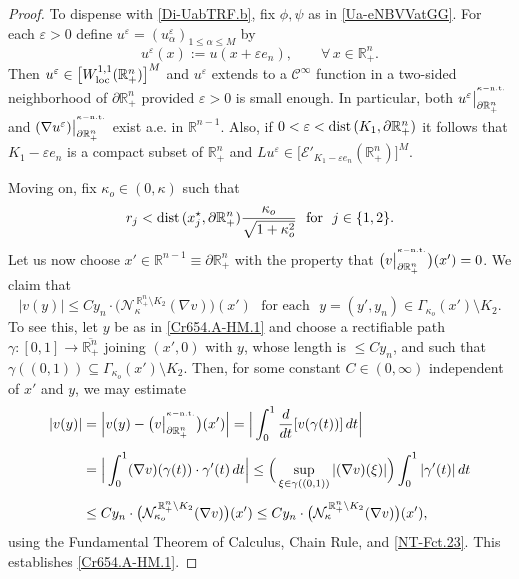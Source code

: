 \documentclass[11pt,reqno]{amsart}
\numberwithin{equation}{section}
\theoremstyle{remark}
\begin{document}
\begin{proof}
To dispense with \eqref{Di-UabTRF.b}, fix $\phi,\psi$ as in \eqref{Ua-eNBVVatGG}.
For each $\varepsilon>0$ define $u^\varepsilon=(u^\varepsilon_\alpha)_{1\leq\alpha\leq M}$ by 
%
\begin{equation}\label{Nvav-T54.a}
u^\varepsilon(x):=u(x+\varepsilon e_n),\qquad\forall\,x\in{\mathbb{R}}^n_{+}.
\end{equation}
%
Then $u^\varepsilon\in\big[W^{1,1}_{\rm loc}({\mathbb{R}}^n_{+})\big]^{M}$ and $u^\varepsilon$ extends to a  
${\mathscr{C}}^\infty$ function in a two-sided neighborhood of $\partial{\mathbb{R}}^n_{+}$ provided 
$\varepsilon>0$ is small enough. In particular, both 
$u^\varepsilon\big|_{\partial\mathbb{R}^{n}_{+}}^{{}^{\kappa-{\rm n.t.}}}$ and 
$(\nabla u^\varepsilon)\big|_{\partial\mathbb{R}^{n}_{+}}^{{}^{\kappa-{\rm n.t.}}}$ exist a.e. in ${\mathbb{R}}^{n-1}$.
Also, if $0<\varepsilon<{\rm dist}\,(K_1,\partial{\mathbb{R}}^n_{+})$ it follows that 
$K_1-\varepsilon e_n$ is a compact subset of ${\mathbb{R}}^n_{+}$ and 
$Lu^\varepsilon\in\big[{\mathcal{E}}'_{K_1-\varepsilon e_n}(\mathbb{R}^{n}_{+})\big]^M$.

Moving on, fix $\kappa_o\in(0,\kappa)$ such that 
%
\begin{equation}\label{CPTs.i}
r_j<{\rm dist}\,(x^\star_j,\partial{\mathbb{R}}^n_{+})\frac{\kappa_o}{\sqrt{1+\kappa^2_o}}
\,\,\text{ for }\,\,j\in\{1,2\}.
\end{equation}
%
Let us now choose $x'\in{\mathbb{R}}^{n-1}\equiv\partial{\mathbb{R}}^n_{+}$ 
with the property that $\big(v\big|^{{}^{\kappa-{\rm n.t.}}}_{\partial{\mathbb{R}}^n_{+}}\big)(x')=0$.
We claim that 
%
\begin{equation}\label{Cr654.A-HM.1}
|v(y)|\leq Cy_n\cdot\big({\mathcal{N}}^{\,\mathbb{R}^{n}_{+}\setminus K_2}_{\kappa}(\nabla v)\big)(x')
\,\,\text{ for each }\,\,y=(y',y_n)\in\Gamma_{\kappa_o}(x')\setminus K_2.
\end{equation}
% 
To see this, let $y$ be as in \eqref{Cr654.A-HM.1} and choose a rectifiable path 
$\gamma:[0,1]\to\overline{{\mathbb{R}}^n_{+}}$ joining $(x',0)$ with $y$, whose length is $\leq Cy_n$, 
and such that $\gamma((0,1))\subseteq\Gamma_{\kappa_o}(x')\setminus K_2$.
Then, for some constant $C\in(0,\infty)$ independent of $x'$ and $y$, we may estimate 
%
\begin{align}\label{Cr654.A-HM.1.xxx}
|v(y)| &=\Big|v(y)-\big(v\big|^{{}^{\kappa-{\rm n.t.}}}_{\partial{\mathbb{R}}^n_{+}}\big)(x')\Big|
=\Big|\int_0^1\frac{d}{dt}[v(\gamma(t))]\,dt\Big|
\nonumber\\[4pt]
&=\Big|\int_0^1(\nabla v)(\gamma(t))\cdot\gamma'(t)\,dt\Big|
\leq\Big(\sup_{\xi\in\gamma((0,1))}|(\nabla v)(\xi)|\Big)\int_0^1|\gamma'(t)|\,dt
\nonumber\\[4pt]
&\leq Cy_n\cdot\big({\mathcal{N}}^{\,\mathbb{R}^{n}_{+}\setminus K_2}_{\kappa_o}(\nabla v)\big)(x')
\leq Cy_n\cdot\big({\mathcal{N}}^{\,\mathbb{R}^{n}_{+}\setminus K_2}_{\kappa}(\nabla v)\big)(x'),
\end{align}
%
using the Fundamental Theorem of Calculus, Chain Rule, and \eqref{NT-Fct.23}. This establishes \eqref{Cr654.A-HM.1}.


\end{proof}
\end{document}
